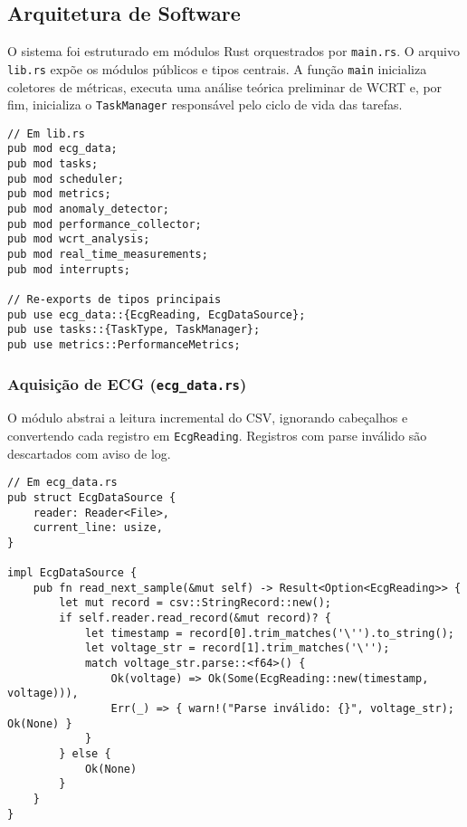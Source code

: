 \documentclass[conference]{IEEEtran}
\begin{document}
\subsection{Arquitetura de Software}
O sistema foi estruturado em módulos Rust orquestrados por \texttt{main.rs}. O arquivo \texttt{lib.rs} expõe os módulos públicos e tipos centrais. A função \texttt{main} inicializa coletores de métricas, executa uma análise teórica preliminar de WCRT e, por fim, inicializa o \texttt{TaskManager} responsável pelo ciclo de vida das tarefas.

\begin{lstlisting}[caption={Módulos públicos em lib.rs (visão geral).}, label={lst:lib_mods_alt}]
// Em lib.rs
pub mod ecg_data;
pub mod tasks;
pub mod scheduler;
pub mod metrics;
pub mod anomaly_detector;
pub mod performance_collector;
pub mod wcrt_analysis;
pub mod real_time_measurements;
pub mod interrupts;

// Re-exports de tipos principais
pub use ecg_data::{EcgReading, EcgDataSource};
pub use tasks::{TaskType, TaskManager};
pub use metrics::PerformanceMetrics;
\end{lstlisting}

\subsubsection{Aquisição de ECG (\texttt{ecg\_data.rs})}
O módulo abstrai a leitura incremental do CSV, ignorando cabeçalhos e convertendo cada registro em \texttt{EcgReading}. Registros com parse inválido são descartados com aviso de log.

\begin{lstlisting}[caption={Leitura de amostras do arquivo CSV.}, label={lst:ecg_data_alt}]
// Em ecg_data.rs
pub struct EcgDataSource {
    reader: Reader<File>,
    current_line: usize,
}

impl EcgDataSource {
    pub fn read_next_sample(&mut self) -> Result<Option<EcgReading>> {
        let mut record = csv::StringRecord::new();
        if self.reader.read_record(&mut record)? {
            let timestamp = record[0].trim_matches('\'').to_string();
            let voltage_str = record[1].trim_matches('\'');
            match voltage_str.parse::<f64>() {
                Ok(voltage) => Ok(Some(EcgReading::new(timestamp, voltage))),
                Err(_) => { warn!("Parse inválido: {}", voltage_str); Ok(None) }
            }
        } else {
            Ok(None)
        }
    }
}
\end{lstlisting}
\end{document}
